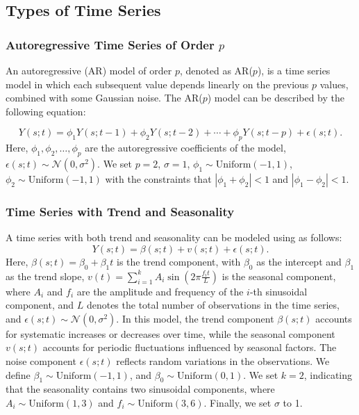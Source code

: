 \documentclass[11pt]{article}
\begin{document}
\subsection{Types of Time Series}
\subsubsection*{Autoregressive Time Series of Order $p$}
An autoregressive (AR) model of order $p$, denoted as AR($p$), is a time series model in which each subsequent value depends linearly on the previous $p$ values, combined with some Gaussian noise. The AR($p$) model can be described by the following equation:

\begin{equation}
	Y(s;t) = \phi_1 Y(s;t-1) + \phi_2 Y(s;t-2) + \cdots + \phi_p Y(s;t-p) + \epsilon(s;t).
\end{equation}
Here, $\phi_1, \phi_2, \dots, \phi_p$ are the autoregressive coefficients of the model, $\epsilon(s;t) \sim \mathcal{N}(0, \sigma^2)$. We set $p=2$, $\sigma=1$, $\phi_1\sim \mathrm{Uniform}(-1,1)$, $\phi_2 \sim \mathrm{Uniform(-1,1)}$ with the constraints that $|\phi_1+\phi_2|<1$ and $|\phi_1-\phi_2|<1$.

\subsubsection*{Time Series with Trend and Seasonality}
A time series with both trend and seasonality can be modeled using as follows:
\begin{equation}
	Y(s;t) = \beta(s;t) + v(s;t) + \epsilon(s;t).
\end{equation}
Here, $\beta(s;t) = \beta_0 + \beta_1 t$ is the trend component, with $\beta_0$ as the intercept and $\beta_1$ as the trend slope, $v(t) = \sum_{i=1}^k A_i \sin\left(2 \pi \frac{f_i t}{L}\right)$ is the seasonal component, where $A_i$ and $f_i$ are the amplitude and frequency of the $i$-th sinusoidal component, and $L$ denotes the total number of observations in the time series, and $\epsilon(s;t) \sim \mathcal{N}(0, \sigma^2)$. In this model, the trend component $\beta(s;t)$ accounts for systematic increases or decreases over time, while the seasonal component $v(s;t)$ accounts for periodic fluctuations influenced by seasonal factors. The noise component $\epsilon(s;t)$ reflects random variations in the observations. We define $\beta_1 \sim \mathrm{Uniform}(-1, 1)$, and $\beta_0 \sim \mathrm{Uniform}(0, 1)$. We set $k = 2$, indicating that the seasonality contains two sinusoidal components, where $A_i \sim \mathrm{Uniform}(1, 3)$ and $f_i \sim \mathrm{Uniform}(3, 6)$. Finally, we set $\sigma$ to 1.
\end{document}
